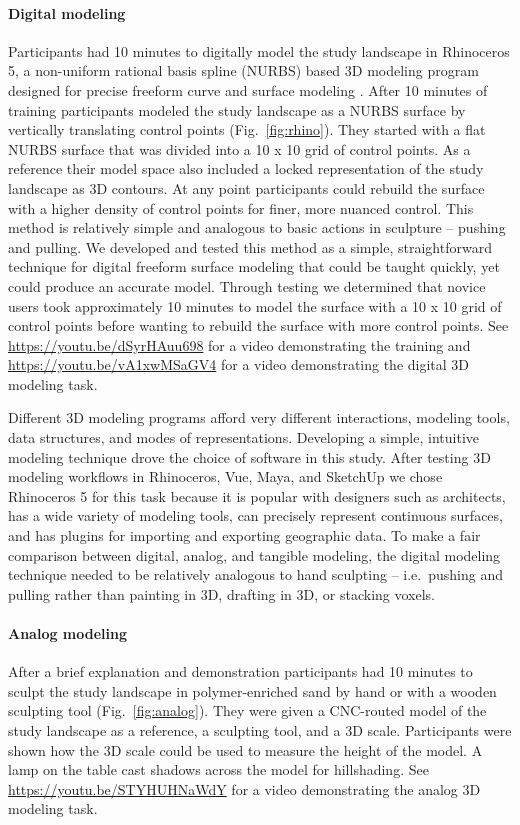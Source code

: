 \documentclass[Afour,sageh,times]{sagej}
\begin{document}
\paragraph{Digital modeling}
Participants had 10 minutes 
to digitally model the study landscape in Rhinoceros 5, 
a non-uniform rational basis spline 
(NURBS) based 3D modeling program
designed for precise freeform curve and surface modeling \cite{Rhino}.
After 10 minutes of training 
participants modeled the study landscape as a NURBS surface 
by vertically translating control points (Fig.~\ref{fig:rhino}). 
They started with a flat NURBS surface that was 
divided into a 10 x 10 grid of control points.
As a reference their model space also included 
a locked representation of the study landscape as 3D contours. 
At any point participants could rebuild the surface 
with a higher density of control points for finer, more nuanced control. 
This method is relatively simple and 
analogous to basic actions in sculpture -- pushing and pulling. 
We developed and tested this method 
as a simple, straightforward technique for  
digital freeform surface modeling
that could be taught quickly, yet could produce an accurate model. 
Through testing we determined that 
novice users took approximately 10 minutes
to model the surface with a 10 x 10 grid of control points
before wanting to rebuild the surface with more control points.
See \url{https://youtu.be/dSyrHAuu698}
for a video demonstrating the training
and \url{https://youtu.be/vA1xwMSaGV4}
for a video demonstrating the digital 3D modeling task.

Different 3D modeling programs afford very different
interactions, modeling tools, data structures, and modes of representations. 
Developing a simple, intuitive modeling technique 
drove the choice of software in this study. 
After testing 3D modeling workflows in 
Rhinoceros, Vue, Maya, and SketchUp
we chose Rhinoceros 5 for this task because it 
is popular with designers such as architects, 
has a wide variety of modeling tools,
can precisely represent continuous surfaces, 
and has plugins for importing and exporting geographic data. 
To make a fair comparison 
between digital, analog, and tangible modeling,
the digital modeling technique 
needed to be relatively analogous to hand sculpting
-- i.e.~pushing and pulling rather than painting in 3D, 
drafting in 3D, or stacking voxels.

\paragraph{Analog modeling}
After a brief explanation and demonstration
participants had 10 minutes to sculpt 
the study landscape in polymer-enriched sand 
by hand or with a wooden sculpting tool (Fig.~\ref{fig:analog}).  
They were given a CNC-routed model of the study landscape 
as a reference, a sculpting tool, and a 3D scale. 
Participants were shown how the 3D scale could be used to 
measure the height of the model. 
A lamp on the table cast shadows across the model for hillshading.
See \url{https://youtu.be/STYHUHNaWdY}
for a video demonstrating the analog 3D modeling task.
\end{document}
